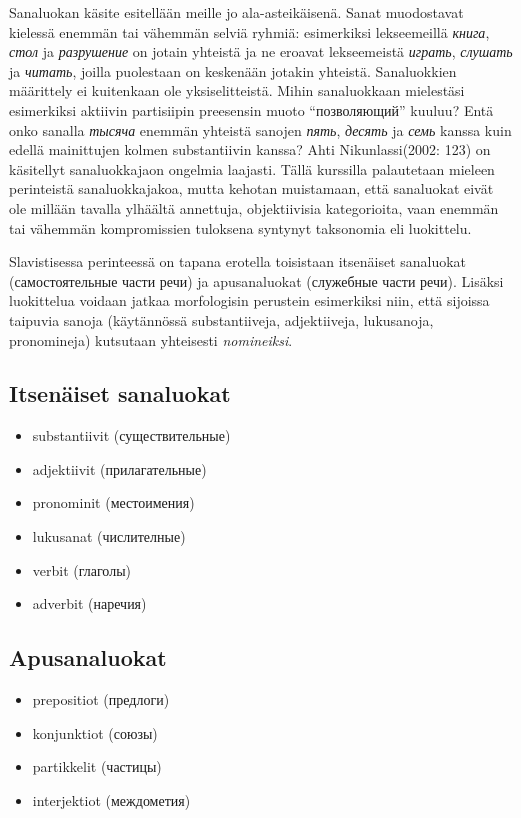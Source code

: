 \documentclass[]{scrreprt}
\providecommand{\tightlist}{%
  \setlength{\itemsep}{0pt}\setlength{\parskip}{0pt}}
\begin{document}
Sanaluokan käsite esitellään meille jo ala-asteikäisenä. Sanat
muodostavat kielessä enemmän tai vähemmän selviä ryhmiä: esimerkiksi
lekseemeillä \emph{книга}, \emph{стол} ja \emph{разрушение} on jotain
yhteistä ja ne eroavat lekseemeistä \emph{играть}, \emph{слушать} ja
\emph{читать}, joilla puolestaan on keskenään jotakin yhteistä. 
Sanaluokkien määrittely ei kuitenkaan ole yksiselitteistä. Mihin
sanaluokkaan mielestäsi esimerkiksi aktiivin partisiipin preesensin
muoto ``позволяющий'' kuuluu? Entä onko sanalla \emph{тысяча} enemmän
yhteistä sanojen \emph{пять}, \emph{десять} ja \emph{семь} kanssa kuin
edellä mainittujen kolmen substantiivin kanssa? Ahti Nikunlassi(2002:
123) on käsitellyt sanaluokkajaon ongelmia laajasti. Tällä kurssilla
palautetaan mieleen perinteistä sanaluokkajakoa, mutta kehotan
muistamaan, että sanaluokat eivät ole millään tavalla ylhäältä
annettuja, objektiivisia kategorioita, vaan enemmän tai vähemmän
kompromissien tuloksena syntynyt taksonomia eli luokittelu.

Slavistisessa perinteessä on tapana erotella toisistaan itsenäiset
sanaluokat (самостоятельные части речи) ja apusanaluokat (служебные
части речи). Lisäksi luokittelua voidaan jatkaa morfologisin perustein
esimerkiksi niin, että sijoissa taipuvia sanoja (käytännössä
substantiiveja, adjektiiveja, lukusanoja, pronomineja) kutsutaan
yhteisesti \emph{nomineiksi}.

\subsection{Itsenäiset sanaluokat}\label{itsenuxe4iset-sanaluokat}

\begin{itemize}
\tightlist
\item
  substantiivit (существительные)
\item
  adjektiivit (прилагательные)
\item
  pronominit (местоимения)
\item
  lukusanat (числителные)
\item
  verbit (глаголы)
\item
  adverbit (наречия)
\end{itemize}

\subsection{Apusanaluokat}\label{apusanaluokat}

\begin{itemize}
\tightlist
\item
  prepositiot (предлоги)
\item
  konjunktiot (союзы)
\item
  partikkelit (частицы)
\item
  interjektiot (междометия)
\end{itemize}
\end{document}
